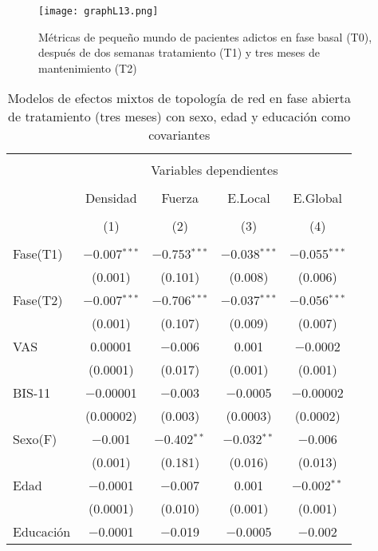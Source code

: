 \begin{figure}[!ht]
    \centering
    \texttt{[image: graphL13.png]}
    \caption{Métricas de pequeño mundo de pacientes adictos en fase basal (T0), después de dos semanas tratamiento (T1) y tres meses de mantenimiento (T2)}
    \label{fig:gpL13}
\end{figure}
\begin{table}[!htbp] \centering
  \caption{Modelos de efectos mixtos de topología de red en fase abierta de tratamiento (tres meses) con sexo, edad y educación como covariantes}
  \label{}
\begin{tabular}{@{\extracolsep{5pt}}lcccc}
\\[-1.8ex]\hline
\hline \\[-1.8ex]
 & \multicolumn{4}{c}{Variables dependientes} \\
\cline{2-5}
\\[-1.8ex] & Densidad & Fuerza & E.Local & E.Global \\
\\[-1.8ex] & (1) & (2) & (3) & (4)\\
\hline \\[-1.8ex]
 Fase(T1) & $-$0.007$^{***}$ & $-$0.753$^{***}$ & $-$0.038$^{***}$ & $-$0.055$^{***}$ \\
  & (0.001) & (0.101) & (0.008) & (0.006) \\
  Fase(T2) & $-$0.007$^{***}$ & $-$0.706$^{***}$ & $-$0.037$^{***}$ & $-$0.056$^{***}$ \\
  & (0.001) & (0.107) & (0.009) & (0.007) \\
  VAS & 0.00001 & $-$0.006 & 0.001 & $-$0.0002 \\
  & (0.0001) & (0.017) & (0.001) & (0.001) \\
  BIS-11 & $-$0.00001 & $-$0.003 & $-$0.0005 & $-$0.00002 \\
  & (0.00002) & (0.003) & (0.0003) & (0.0002) \\
  Sexo(F) & $-$0.001 & $-$0.402$^{**}$ & $-$0.032$^{**}$ & $-$0.006 \\
  & (0.001) & (0.181) & (0.016) & (0.013) \\
  Edad & $-$0.0001 & $-$0.007 & 0.001 & $-$0.002$^{**}$ \\
  & (0.0001) & (0.010) & (0.001) & (0.001) \\
  Educación & $-$0.0001 & $-$0.019 & $-$0.0005 & $-$0.002 \\

\end{tabular}
\end{table}

